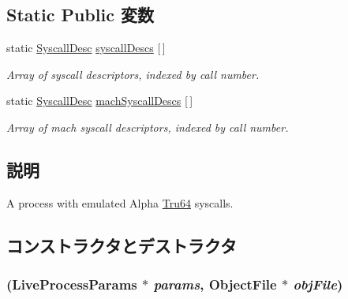 \subsection*{Static Public 変数}
\begin{DoxyCompactItemize}
\item 
static \hyperlink{classSyscallDesc}{SyscallDesc} \hyperlink{classAlphaISA_1_1AlphaTru64Process_a08d67a94820b75842e07f030e548372e}{syscallDescs} \mbox{[}$\,$\mbox{]}
\begin{DoxyCompactList}\small\item\em Array of syscall descriptors, indexed by call number. \item\end{DoxyCompactList}\item 
static \hyperlink{classSyscallDesc}{SyscallDesc} \hyperlink{classAlphaISA_1_1AlphaTru64Process_ab029b90db3c7a2d9f927271d535727c1}{machSyscallDescs} \mbox{[}$\,$\mbox{]}
\begin{DoxyCompactList}\small\item\em Array of mach syscall descriptors, indexed by call number. \item\end{DoxyCompactList}\end{DoxyCompactItemize}


\subsection{説明}
A process with emulated Alpha \hyperlink{classTru64}{Tru64} syscalls. 

\subsection{コンストラクタとデストラクタ}
\hypertarget{classAlphaISA_1_1AlphaTru64Process_ab52e01bd8111d3d5aff45bdf7027d869}{
\subsubsection[{AlphaTru64Process}]{ (LiveProcessParams $\ast$ {\em params}, \/  {\bf ObjectFile} $\ast$ {\em objFile})}}
\label{classAlphaISA_1_1AlphaTru64Process_ab52e01bd8111d3d5aff45bdf7027d869}


